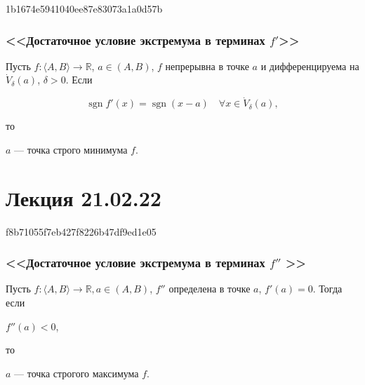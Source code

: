 \begin{note}{1b1674e5941040ee87e83073a1a0d57b}
    \subsubsection{<<Достаточное условие экстремума в терминах \( f' \)>>}

    Пусть \( f : \langle A, B \rangle \to \mathbb R \), \( a \in (A, B)  \), \( f \) непрерывна в точке \( a \) и дифференцируема на \( \dot V_{\delta} (a) \), \( \delta > 0 \).
    Если
    \begin{icloze}{1}\[
        \operatorname{sgn} f'(x) = \operatorname{sgn} (x - a) \quad \forall x \in \dot V_{\delta} (a),
    \]\end{icloze}
    то \begin{icloze}{2}\( a \) --- точка строго минимума \( f \).\end{icloze}
\end{note}

\section{Лекция 21.02.22}

\begin{note}{f8b71055f7eb427f8226b47df9ed1e05}
    \subsubsection{<<Достаточное условие экстремума в терминах \( f'' \) >>}
    Пусть \( f : \langle A, B \rangle \to \mathbb R, a \in (A, B) \), \( f'' \) определена в точке \( a \), \( f'(a) = 0 \).
    Тогда если \begin{icloze}{1}\( f''(a) < 0 \),\end{icloze} то \begin{icloze}{2}\( a \) --- точка строгого максимума \( f \).\end{icloze}
\end{note}

